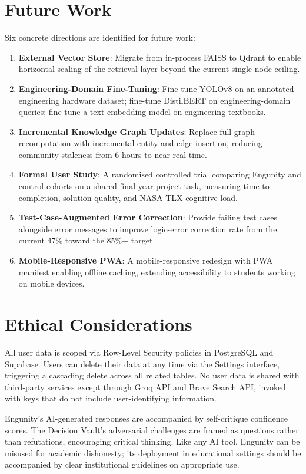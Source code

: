 \section{Future Work}
\label{sec:future-work}

Six concrete directions are identified for future work:
\begin{enumerate}
    \item \textbf{External Vector Store}: Migrate from in-process FAISS to Qdrant to enable horizontal scaling of the retrieval layer beyond the current single-node ceiling.
    \item \textbf{Engineering-Domain Fine-Tuning}: Fine-tune YOLOv8 on an annotated engineering hardware dataset; fine-tune DistilBERT on engineering-domain queries; fine-tune a text embedding model on engineering textbooks.
    \item \textbf{Incremental Knowledge Graph Updates}: Replace full-graph recomputation with incremental entity and edge insertion, reducing community staleness from 6 hours to near-real-time.
    \item \textbf{Formal User Study}: A randomised controlled trial comparing Engunity and control cohorts on a shared final-year project task, measuring time-to-completion, solution quality, and NASA-TLX cognitive load.
    \item \textbf{Test-Case-Augmented Error Correction}: Provide failing test cases alongside error messages to improve logic-error correction rate from the current 47\% toward the 85\%+ target.
    \item \textbf{Mobile-Responsive PWA}: A mobile-responsive redesign with PWA manifest enabling offline caching, extending accessibility to students working on mobile devices.
\end{enumerate}

\section{Ethical Considerations}
\label{sec:ethics}

All user data is scoped via Row-Level Security policies in PostgreSQL and Supabase. Users can delete their data at any time via the Settings interface, triggering a cascading delete across all related tables. No user data is shared with third-party services except through Groq API and Brave Search API, invoked with keys that do not include user-identifying information.

Engunity's AI-generated responses are accompanied by self-critique confidence scores. The Decision Vault's adversarial challenges are framed as questions rather than refutations, encouraging critical thinking. Like any AI tool, Engunity can be misused for academic dishonesty; its deployment in educational settings should be accompanied by clear institutional guidelines on appropriate use.


